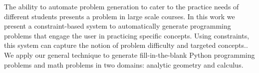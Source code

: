 The ability to automate problem generation to cater to the practice needs of different students presents a problem in large scale courses. In this work we present a constraint-based system to automatically generate programming problems that engage the user in practicing specific concepts. Using constraints, this system can capture the notion of problem difficulty and targeted concepts.. We apply our general technique to generate fill-in-the-blank Python programming problems and math problems in two domains: analytic geometry and calculus.